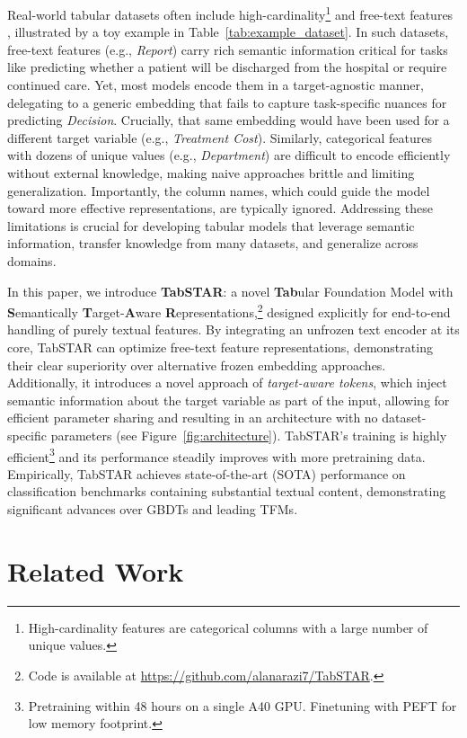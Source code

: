 \documentclass{article}
\begin{document}
Real-world tabular datasets often include high-cardinality\footnote{High-cardinality features are categorical columns with a large number of unique values.} and free-text features \cite{cerda_encoding_2022}, illustrated by a toy example in Table~\ref{tab:example_dataset}. In such datasets, free-text features (e.g., \textit{Report}) carry rich semantic information critical for tasks like predicting whether a patient will be discharged from the hospital or require continued care. Yet, most models encode them in a target-agnostic manner, delegating to a generic embedding that fails to capture task-specific nuances for predicting \textit{Decision}. Crucially, that same embedding would have been used for a different target variable (e.g., \textit{Treatment Cost}). Similarly, categorical features with dozens of unique values (e.g., \textit{Department}) are difficult to encode efficiently without external knowledge, making naive approaches brittle and limiting generalization. Importantly, the column names, which could guide the model toward more effective representations, are typically ignored. Addressing these limitations is crucial for developing tabular models that leverage semantic information, transfer knowledge from many datasets, and generalize across domains.


In this paper, we introduce \textbf{TabSTAR}: a novel \textbf{Tab}ular Foundation Model with \textbf{S}emantically \textbf{T}arget-\textbf{A}ware \textbf{R}epresentations,\footnote{Code is available at \url{https://github.com/alanarazi7/TabSTAR}.} designed explicitly for end-to-end handling of purely textual features. By integrating an unfrozen text encoder at its core, TabSTAR can optimize free-text feature representations, demonstrating their clear superiority over alternative frozen embedding approaches. Additionally, it introduces a novel approach of \emph{target-aware tokens}, which inject semantic information about the target variable as part of the input, allowing for efficient parameter sharing and resulting in an architecture with no dataset-specific parameters (see Figure~\ref{fig:architecture}). TabSTAR's training is highly efficient\footnote{Pretraining within 48 hours on a single A40 GPU. Finetuning with PEFT for low memory footprint.} and its performance steadily improves with more pretraining data. Empirically, TabSTAR achieves state-of-the-art (SOTA) performance on classification benchmarks containing substantial textual content, demonstrating significant advances over GBDTs and leading TFMs.


\section{Related Work}\label{sec:related}
\end{document}
